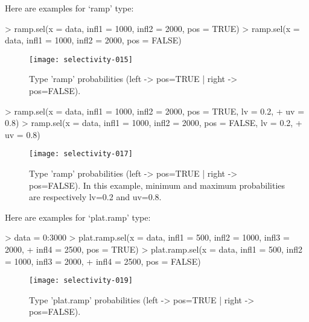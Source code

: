 \documentclass[letterpaper, 12pt]{article}
\begin{document}
Here are examples for `ramp' type:
\begin{Schunk}
\begin{Sinput}
> ramp.sel(x = data, infl1 = 1000, infl2 = 2000, pos = TRUE)
> ramp.sel(x = data, infl1 = 1000, infl2 = 2000, pos = FALSE)
\end{Sinput}
\end{Schunk}

\begin{figure}[h]
\vspace{-20pt}
\begin{center}
\texttt{[image: selectivity-015]}
\end{center}
\vspace{-30pt}
\caption{Type 'ramp' probabilities (left -> pos=TRUE |  right -> pos=FALSE).}
\vspace{-10pt}
\label{fig7}
\end{figure}

\vspace*{\fill}
\newpage


\begin{Schunk}
\begin{Sinput}
> ramp.sel(x = data, infl1 = 1000, infl2 = 2000, pos = TRUE, lv = 0.2, 
+     uv = 0.8)
> ramp.sel(x = data, infl1 = 1000, infl2 = 2000, pos = FALSE, lv = 0.2, 
+     uv = 0.8)
\end{Sinput}
\end{Schunk}

\begin{figure}[h]
\vspace{-20pt}
\begin{center}
\texttt{[image: selectivity-017]}
\end{center}
\vspace{-30pt}
\caption{Type 'ramp' probabilities (left -> pos=TRUE |  right -> pos=FALSE). In this example, minimum and maximum probabilities are respectively lv=0.2 and uv=0.8.}
\vspace{-10pt}
\label{fig8}
\end{figure}

\newpage

Here are examples for `plat.ramp' type:
\begin{Schunk}
\begin{Sinput}
> data = 0:3000
> plat.ramp.sel(x = data, infl1 = 500, infl2 = 1000, infl3 = 2000, 
+     infl4 = 2500, pos = TRUE)
> plat.ramp.sel(x = data, infl1 = 500, infl2 = 1000, infl3 = 2000, 
+     infl4 = 2500, pos = FALSE)
\end{Sinput}
\end{Schunk}
\begin{figure}[h]
\vspace{-20pt}
\begin{center}
\texttt{[image: selectivity-019]}
\end{center}
\vspace{-30pt}
\caption{Type 'plat.ramp' probabilities (left -> pos=TRUE |  right -> pos=FALSE).}
\vspace{-10pt}
\label{fig9}
\end{figure}
\end{document}
